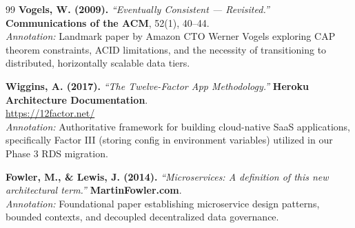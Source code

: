 \documentclass[11pt,a4paper]{article}
\begin{document}
\begin{thebibliography}{99}
\textbf{Vogels, W. (2009).} \textit{``Eventually Consistent --- Revisited.''} \textbf{Communications of the ACM}, 52(1), 40--44.\\
\textit{Annotation:} Landmark paper by Amazon CTO Werner Vogels exploring CAP theorem constraints, ACID limitations, and the necessity of transitioning to distributed, horizontally scalable data tiers.

\textbf{Wiggins, A. (2017).} \textit{``The Twelve-Factor App Methodology.''} \textbf{Heroku Architecture Documentation}.\\
\url{https://12factor.net/}\\
\textit{Annotation:} Authoritative framework for building cloud-native SaaS applications, specifically Factor III (storing config in environment variables) utilized in our Phase 3 RDS migration.

\textbf{Fowler, M., \& Lewis, J. (2014).} \textit{``Microservices: A definition of this new architectural term.''} \textbf{MartinFowler.com}.\\
\textit{Annotation:} Foundational paper establishing microservice design patterns, bounded contexts, and decoupled decentralized data governance.

\end{thebibliography}
\end{document}
